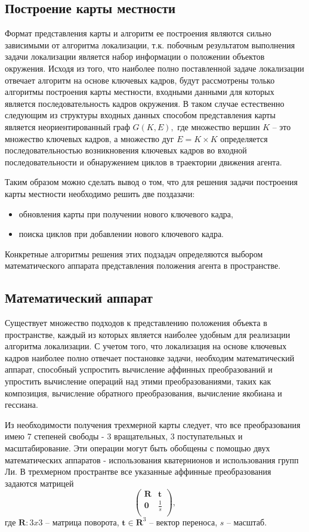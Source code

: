 \subsection{Построение карты местности}
Формат представления карты и алгоритм ее построения являются сильно зависимыми от алгоритма локализации, т.к. побочным результатом выполнения задачи локализации является набор информации о положении объектов окружения. Исходя из того, что наиболее полно поставленной задаче локализации отвечает алгоритм на основе ключевых кадров, будут рассмотрены только алгоритмы построения карты местности, входными данными для которых является последовательность кадров окружения. В таком случае естественно следующим из структуры входных данных способом представления карты является неориентированный граф $G(K, E),$ где множество вершин $K$ -- это множество ключевых кадров, а множество дуг $E = K \times K$ определяется последовательностью возникновения ключевых кадров во входной последовательности и обнаружением циклов в траектории движения агента.


Таким образом можно сделать вывод о том, что для решения задачи построения карты местности необходимо решить две поздазачи:
\begin{itemize}
    \item обновления карты при получении нового ключевого кадра,
    \item поиска циклов при добавлении нового ключевого кадра.
\end{itemize}


Конкретные алгоритмы решения этих подзадач определяются выбором математического аппарата представления положения агента в пространстве.


\subsection{Математический аппарат}
Существует множество подходов к представлению положения объекта в пространстве, каждый из которых является наиболее удобным для реализации алгоритма локализации. С учетом того, что локализация на основе ключевых кадров наиболее полно отвечает постановке задачи, необходим математический аппарат, способный успростить вычисление аффинных преобразований и упростить вычисление операций над этими преобразованиями, таких как композиция, вычисление обратного преобразования, вычисление якобиана и гессиана.


Из необходимости получения трехмерной карты следует, что все преобразования имею 7 степеней свободы - 3 вращательных, 3 поступательных и масштабирование. Эти операции могут быть обобщены с помощью двух математических аппаратов - использования кватернионов и использования групп Ли. В трехмерном пространтве все указанные аффинные преобразования задаются матрицей
\begin{equation}
    \begin{pmatrix}
    \mathbf{R} & \mathbf{t}  \\
    \mathbf{0} & \frac{1}{s} \\
    \end{pmatrix},
\end{equation}
где $\mathbf{R}: 3x3$ -- матрица поворота, $\mathbf{t} \in \mathbf{R}^3$ -- вектор переноса, $s$ -- масштаб.


